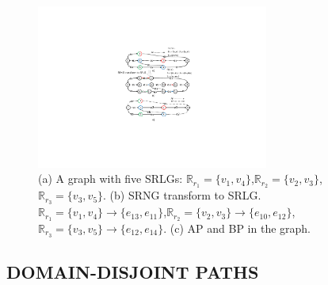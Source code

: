 \begin{figure}[tp]
  \centering
  \includegraphics[width=3.0in]{franz/SRNG}
  \caption{(a) A graph with five SRLGs: $\mathbb{R}_{r_1}=\{v_1,v_4\}$,$\mathbb{R}_{r_2}=\{v_2,v_3\}$,$\mathbb{R}_{r_3}=\{v_3,v_5\}$. (b) SRNG transform to SRLG. $\mathbb{R}_{r_1}=\{v_1,v_4\}\rightarrow \{e_{13},e_{11}\}$,$\mathbb{R}_{r_2}=\{v_2,v_3\}\rightarrow \{e_{10},e_{12}\}$,$\mathbb{R}_{r_3}=\{v_3,v_5\}\rightarrow \{e_{12},e_{14}\}$. (c) AP and BP in the graph.}\label{fig:SRNG}
  \label{fig:SRNG}
\end{figure}


\subsection{DOMAIN-DISJOINT PATHS}
